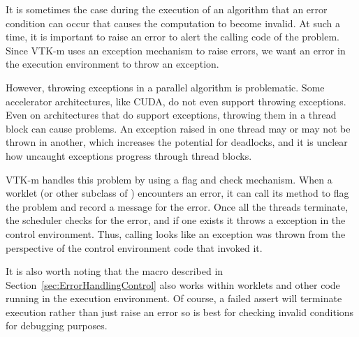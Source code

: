 

It is sometimes the case during the execution of an algorithm that an error
condition can occur that causes the computation to become invalid. At such
a time, it is important to raise an error to alert the calling code of the
problem. Since VTK-m uses an exception mechanism to raise errors, we want
an error in the execution environment to throw an exception.

However, throwing exceptions in a parallel algorithm is problematic. Some
accelerator architectures, like CUDA, do not even support throwing
exceptions. Even on architectures that do support exceptions, throwing them
in a thread block can cause problems. An exception raised in one thread may
or may not be thrown in another, which increases the potential for
deadlocks, and it is unclear how uncaught exceptions progress through
thread blocks.

VTK-m handles this problem by using a flag and check mechanism. When a
worklet (or other subclass of ) encounters an error,
it can call its  method to flag the problem and record
a message for the error. Once all the threads terminate, the scheduler
checks for the error, and if one exists it throws a
 exception in the control environment. Thus,
calling  looks like an exception was thrown from the
perspective of the control environment code that invoked it.




It is also worth noting that the  macro described
in Section~\ref{sec:ErrorHandlingControl} also works within worklets and
other code running in the execution environment. Of course, a failed assert
will terminate execution rather than just raise an error so is best for
checking invalid conditions for debugging purposes.



